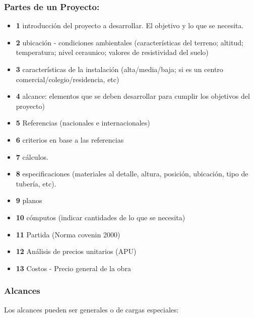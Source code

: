 \documentclass[11pt,letterpaper]{article}
\begin{document}
\subsubsection{Partes de un Proyecto:}
\begin{itemize}
	\item \textbf{1} introducción del proyecto a desarrollar. El objetivo y lo que se necesita.

	\item \textbf{2} ubicación - condiciones ambientales (características del terreno; altitud; temperatura; nivel ceraunico; valores de resistividad del suelo)

	\item \textbf{3} características de la instalación (alta/media/baja; si es un centro comercial/colegio/residencia, etc)
 
	\item \textbf{4} alcance: elementos que se deben desarrollar para cumplir los objetivos del proyecto)

	\item \textbf{5} Referencias (nacionales e internacionales) 

	\item \textbf{6} criterios en base a las referencias 

	\item \textbf{7} cálculos.

	\item \textbf{8} especificaciones (materiales al detalle, altura, posición, ubicación, tipo de tubería, etc).

	\item \textbf{9} planos

	\item \textbf{10} cómputos (indicar cantidades de lo que se necesita)

	\item \textbf{11} Partida (Norma covenin 2000)

	\item \textbf{12} Análisis de precios unitarios (APU)

	\item \textbf{13} Costos - Precio general de la obra
\end{itemize}

\subsubsection{Alcances}
Los alcances pueden ser generales o de cargas especiales:
\end{document}
